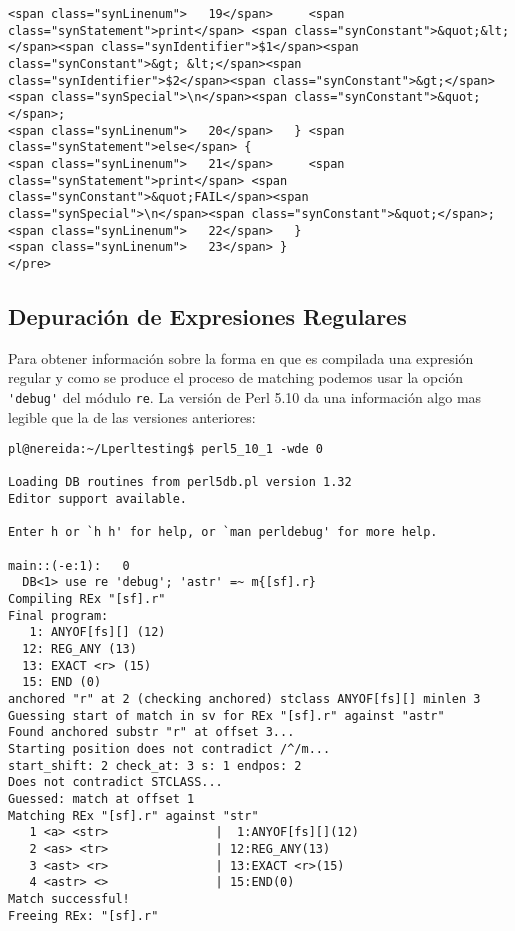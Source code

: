 \begin{exercise}
\begin{itemize}
\begin{verbatim}
<span class="synLinenum">   19</span>     <span class="synStatement">print</span> <span class="synConstant">&quot;&lt;</span><span class="synIdentifier">$1</span><span class="synConstant">&gt; &lt;</span><span class="synIdentifier">$2</span><span class="synConstant">&gt;</span><span class="synSpecial">\n</span><span class="synConstant">&quot;</span>;
<span class="synLinenum">   20</span>   } <span class="synStatement">else</span> {
<span class="synLinenum">   21</span>     <span class="synStatement">print</span> <span class="synConstant">&quot;FAIL</span><span class="synSpecial">\n</span><span class="synConstant">&quot;</span>;
<span class="synLinenum">   22</span>   }
<span class="synLinenum">   23</span> }
</pre>

\end{verbatim}
\end{itemize}

\end{exercise}


\subsection{Depuración de Expresiones Regulares}

Para obtener información sobre la forma en que es compilada una expresión regular
y como se produce el proceso de matching podemos usar la opción
\verb|'debug'| del módulo \verb|re|. La versión de Perl 5.10 da una información 
algo mas legible que la de las versiones anteriores:

\begin{verbatim}
pl@nereida:~/Lperltesting$ perl5_10_1 -wde 0

Loading DB routines from perl5db.pl version 1.32
Editor support available.

Enter h or `h h' for help, or `man perldebug' for more help.

main::(-e:1):   0
  DB<1> use re 'debug'; 'astr' =~ m{[sf].r}
Compiling REx "[sf].r"
Final program:
   1: ANYOF[fs][] (12)
  12: REG_ANY (13)
  13: EXACT <r> (15)
  15: END (0)
anchored "r" at 2 (checking anchored) stclass ANYOF[fs][] minlen 3
Guessing start of match in sv for REx "[sf].r" against "astr"
Found anchored substr "r" at offset 3...
Starting position does not contradict /^/m...
start_shift: 2 check_at: 3 s: 1 endpos: 2
Does not contradict STCLASS...
Guessed: match at offset 1
Matching REx "[sf].r" against "str"
   1 <a> <str>               |  1:ANYOF[fs][](12)
   2 <as> <tr>               | 12:REG_ANY(13)
   3 <ast> <r>               | 13:EXACT <r>(15)
   4 <astr> <>               | 15:END(0)
Match successful!
Freeing REx: "[sf].r"
\end{verbatim}


